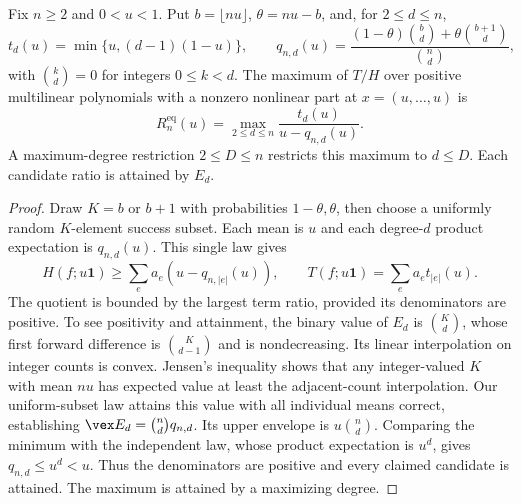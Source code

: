\begin{theorem}\label{thm:equal-finite}
Fix $n\ge2$ and $0<u<1$. Put $b=\lfloor nu\rfloor$,
$\theta=nu-b$, and, for $2\le d\le n$,
\[
 t_d(u)=\min\{u,(d-1)(1-u)\},\qquad
 q_{n,d}(u)=\frac{(1-\theta)\binom bd+\theta\binom{b+1}d}{\binom nd},
\]
with $\binom{k}{d}=0$ for integers $0\le k<d$. The maximum of $T/H$
over positive multilinear polynomials with a nonzero nonlinear part at
$x=(u,\ldots,u)$ is
\begin{equation}\label{eq:equal-finite}
 R_n^{\mathrm{eq}}(u)=\max_{2\le d\le n}
                \frac{t_d(u)}{u-q_{n,d}(u)}.
\end{equation}
A maximum-degree restriction $2\le D\le n$ restricts this maximum to
$d\le D$. Each candidate ratio is attained by $E_d$.
\end{theorem}
\begin{proof}
Draw $K=b$ or $b+1$ with probabilities $1-\theta,\theta$, then choose
a uniformly random $K$-element success subset. Each mean is $u$ and
each degree-$d$ product expectation is $q_{n,d}(u)$. This single law gives
\[
 H(f;u\boldsymbol1)\ge\sum_ea_e(u-q_{n,|e|}(u)),\qquad
 T(f;u\boldsymbol1)=\sum_ea_et_{|e|}(u).
\]
The quotient is bounded by the largest term ratio, provided its
denominators are positive. To see positivity and attainment, the binary
value of $E_d$ is $\binom Kd$, whose first forward difference is
$\binom K{d-1}$ and is nondecreasing. Its linear interpolation on integer
counts is convex. Jensen's inequality shows that any integer-valued $K$
with mean $nu$ has expected value at least the adjacent-count
interpolation. Our uniform-subset law attains this value with all
individual means correct, establishing $\vex E_d=\binom nd q_{n,d}$.
Its upper envelope is $u\binom nd$. Comparing the minimum with the
independent law, whose product expectation is $u^d$, gives
$q_{n,d}\le u^d<u$. Thus the denominators are positive and every claimed
candidate is attained. The maximum is attained by a maximizing degree.
\end{proof}

